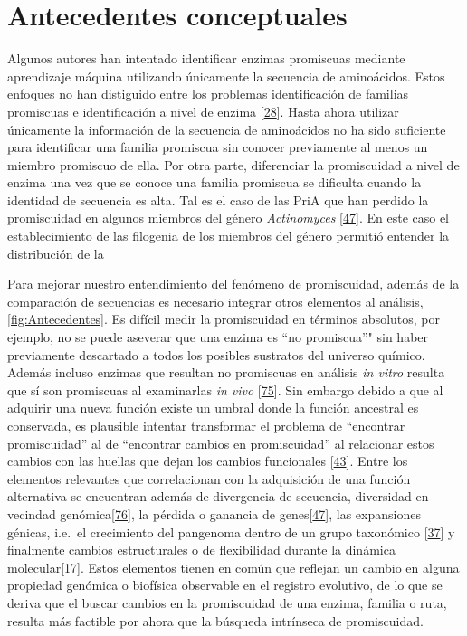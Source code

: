 \documentclass[12pt,twoside]{reedthesis}
\begin{document}
  \section{Antecedentes conceptuales}\label{antecedentes-conceptuales}
  
  Algunos autores han intentado identificar enzimas promiscuas mediante
  aprendizaje máquina utilizando únicamente la secuencia de aminoácidos.
  Estos enfoques no han distiguido entre los problemas identificación de
  familias promiscuas e identificación a nivel de enzima
  {[}\protect\hyperlink{ref-carbonell_molecular_2010}{28}{]}. Hasta ahora
  utilizar únicamente la información de la secuencia de aminoácidos no ha
  sido suficiente para identificar una familia promiscua sin conocer
  previamente al menos un miembro promiscuo de ella. Por otra parte,
  diferenciar la promiscuidad a nivel de enzima una vez que se conoce una
  familia promiscua se dificulta cuando la identidad de secuencia es alta.
  Tal es el caso de las PriA que han perdido la promiscuidad en algunos
  miembros del género \emph{Actinomyces}
  {[}\protect\hyperlink{ref-juarez-vazquez_evolution_2017}{47}{]}. En este
  caso el establecimiento de las filogenia de los miembros del género
  permitió entender la distribución de la
  
  Para mejorar nuestro entendimiento del fenómeno de promiscuidad, además
  de la comparación de secuencias es necesario integrar otros elementos al
  análisis,\autoref{fig:Antecedentes}. Es difícil medir la promiscuidad en
  términos absolutos, por ejemplo, no se puede aseverar que una enzima es
  ``no promiscua''" sin haber previamente descartado a todos los posibles
  sustratos del universo químico. Además incluso enzimas que resultan no
  promiscuas en análisis \emph{in vitro} resulta que sí son promiscuas al
  examinarlas \emph{in vivo}
  {[}\protect\hyperlink{ref-noda_tesis_2012}{75}{]}. Sin embargo debido a
  que al adquirir una nueva función existe un umbral donde la función
  ancestral es conservada, es plausible intentar transformar el problema
  de ``encontrar promiscuidad'' al de ``encontrar cambios en
  promiscuidad'' al relacionar estos cambios con las huellas que dejan los
  cambios funcionales
  {[}\protect\hyperlink{ref-soskine_mutational_2010}{43}{]}. Entre los
  elementos relevantes que correlacionan con la adquisición de una función
  alternativa se encuentran además de divergencia de secuencia, diversidad
  en vecindad
  genómica{[}\protect\hyperlink{ref-zhao__function_prediction_neighbourhood_2014}{76}{]},
  la pérdida o ganancia de
  genes{[}\protect\hyperlink{ref-juarez-vazquez_evolution_2017}{47}{]},
  las expansiones génicas, i.e.~el crecimiento del pangenoma dentro de un
  grupo taxonómico
  {[}\protect\hyperlink{ref-martinez-nunez_lifestyle_2015}{37}{]} y
  finalmente cambios estructurales o de flexibilidad durante la dinámica
  molecular{[}\protect\hyperlink{ref-zou_evolution_2015}{17}{]}. Estos
  elementos tienen en común que reflejan un cambio en alguna propiedad
  genómica o biofísica observable en el registro evolutivo, de lo que se
  deriva que el buscar cambios en la promiscuidad de una enzima, familia o
  ruta, resulta más factible por ahora que la búsqueda intrínseca de
  promiscuidad.
  
\end{document}
